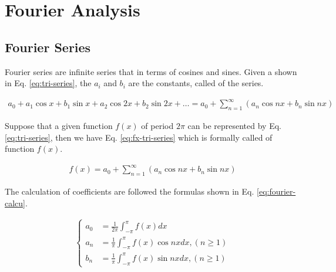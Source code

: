 \section{Fourier Analysis}

\subsection{Fourier Series}

Fourier series are infinite series that  in terms of cosines and sines.
Given a  shown in Eq. \ref{eq:tri-series}, the $a_i$ and $b_i$ are the constants, called  of the series.

\begin{align}
  a_0 + a_1 \cos x + b_1 \sin x + a_2 \cos 2x + b_2 \sin 2x + \dots = a_0 + \sum^\infty_{n=1}(a_n \cos nx + b_n \sin nx)
  \label{eq:tri-series}
\end{align}

Suppose that a given function $f(x)$ of period $2\pi$ can be represented by Eq. \ref{eq:tri-series}, then we have Eq. \ref{eq:fx-tri-series} which is formally called  of function $f(x)$.

\begin{align}
  f(x) = a_0 + \sum^\infty_{n=1}(a_n \cos nx + b_n \sin nx)
  \label{eq:fx-tri-series}
\end{align}

The calculation of coefficients are followed the formulas shown in Eq. \ref{eq:fourier-calcu}.

\begin{align}
  \begin{cases}
    a_0 &= \frac{1}{2\pi}\int_{-\pi}^{\pi} f(x) dx \\
    a_n &= \frac{1}{\pi}\int_{-\pi}^{\pi} f(x)\cos nx dx, (n \geq 1) \\
    b_n &= \frac{1}{\pi}\int_{-\pi}^{\pi} f(x)\sin nx dx, (n \geq 1)
  \end{cases}
  \label{eq:fourier-calcu}
\end{align}